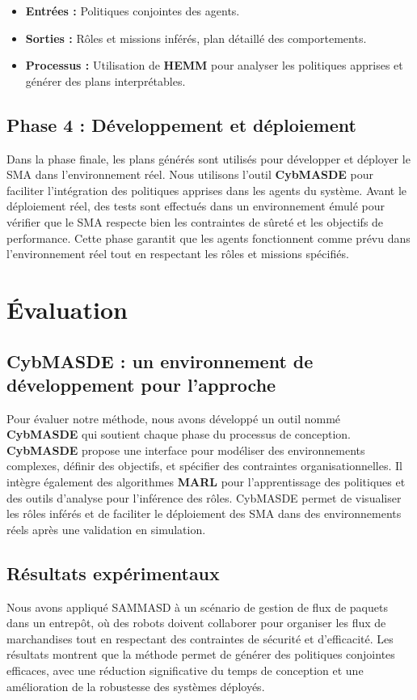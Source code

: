\documentclass[sigconf,anonymous]{aamas}
\begin{document}
\begin{itemize}
  \item \textbf{Entrées :} Politiques conjointes des agents.
  \item \textbf{Sorties :} Rôles et missions inférés, plan détaillé des comportements.
  \item \textbf{Processus :} Utilisation de \textbf{HEMM} pour analyser les politiques apprises et générer des plans interprétables.
\end{itemize}

\subsection{Phase 4 : Développement et déploiement}
Dans la phase finale, les plans générés sont utilisés pour développer et déployer le SMA dans l'environnement réel. Nous utilisons l'outil \textbf{CybMASDE} pour faciliter l'intégration des politiques apprises dans les agents du système. Avant le déploiement réel, des tests sont effectués dans un environnement émulé pour vérifier que le SMA respecte bien les contraintes de sûreté et les objectifs de performance. Cette phase garantit que les agents fonctionnent comme prévu dans l'environnement réel tout en respectant les rôles et missions spécifiés.

\section{Évaluation}
\label{sec:evaluation}

\subsection{CybMASDE : un environnement de développement pour l'approche}
Pour évaluer notre méthode, nous avons développé un outil nommé \textbf{CybMASDE} qui soutient chaque phase du processus de conception. \textbf{CybMASDE} propose une interface pour modéliser des environnements complexes, définir des objectifs, et spécifier des contraintes organisationnelles. Il intègre également des algorithmes \textbf{MARL} pour l'apprentissage des politiques et des outils d'analyse pour l'inférence des rôles. CybMASDE permet de visualiser les rôles inférés et de faciliter le déploiement des SMA dans des environnements réels après une validation en simulation.

\subsection{Résultats expérimentaux}
Nous avons appliqué SAMMASD à un scénario de gestion de flux de paquets dans un entrepôt, où des robots doivent collaborer pour organiser les flux de marchandises tout en respectant des contraintes de sécurité et d'efficacité. Les résultats montrent que la méthode permet de générer des politiques conjointes efficaces, avec une réduction significative du temps de conception et une amélioration de la robustesse des systèmes déployés.
\end{document}
